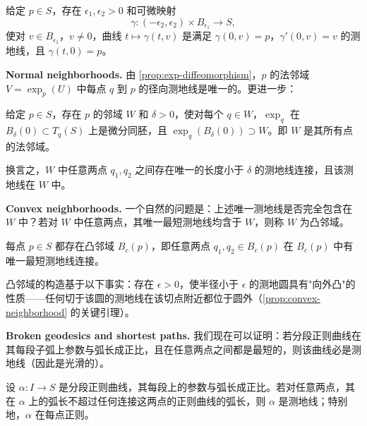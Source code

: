 \begin{Theorem}[测地线的可微依赖]\label{geodesic-dependence}
给定 $p \in S$，存在 $\epsilon_1, \epsilon_2 > 0$ 和可微映射
\[
\gamma: (-\epsilon_2, \epsilon_2) \times B_{\epsilon_1} \to S,
\]
使对 $v \in B_{\epsilon_1}$，$v \neq 0$，曲线 $t \mapsto \gamma(t,v)$ 是满足 $\gamma(0,v)=p$，$\gamma'(0,v)=v$ 的测地线，且 $\gamma(t,0) = p$。
\end{Theorem}

\textbf{Normal neighborhoods.} 由 \cref{prop:exp-diffeomorphism}，$p$ 的法邻域 $V = \exp_p(U)$ 中每点 $q$ 到 $p$ 的径向测地线是唯一的。更进一步：

\begin{Proposition}[统一法邻域]\label{prop:uniform-normal}
给定 $p \in S$，存在 $p$ 的邻域 $W$ 和 $\delta > 0$，使对每个 $q \in W$，$\exp_q$ 在 $B_\delta(0) \subset T_q(S)$ 上是微分同胚，且 $\exp_q(B_\delta(0)) \supset W$。即 $W$ 是其所有点的法邻域。
\end{Proposition}

换言之，$W$ 中任意两点 $q_1, q_2$ 之间存在唯一的长度小于 $\delta$ 的测地线连接，且该测地线在 $W$ 中。

\textbf{Convex neighborhoods.} 一个自然的问题是：上述唯一测地线是否完全包含在 $W$ 中？若对 $W$ 中任意两点，其唯一最短测地线均含于 $W$，则称 $W$ 为凸邻域。

\begin{Proposition}[凸邻域的存在性]\label{prop:convex-neighborhood}
每点 $p \in S$ 都存在凸邻域 $B_c(p)$，即任意两点 $q_1, q_2 \in B_c(p)$ 在 $B_c(p)$ 中有唯一最短测地线连接。
\end{Proposition}

\begin{Remark}
凸邻域的构造基于以下事实：存在 $\epsilon > 0$，使半径小于 $\epsilon$ 的测地圆具有"向外凸"的性质——任何切于该圆的测地线在该切点附近都位于圆外（\cref{prop:convex-neighborhood} 的关键引理）。
\end{Remark}

\textbf{Broken geodesics and shortest paths.} 我们现在可以证明：若分段正则曲线在其每段子弧上参数与弧长成正比，且在任意两点之间都是最短的，则该曲线必是测地线（因此是光滑的）。

\begin{Proposition}[最短路径必光滑]\label{prop:shortest-implies-geodesic}
设 $\alpha: I \to S$ 是分段正则曲线，其每段上的参数与弧长成正比。若对任意两点，其在 $\alpha$ 上的弧长不超过任何连接这两点的正则曲线的弧长，则 $\alpha$ 是测地线；特别地，$\alpha$ 在每点正则。
\end{Proposition}

